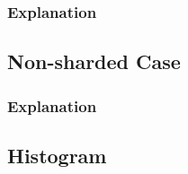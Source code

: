 \documentclass[11pt,a4paper]{article}
\begin{document}
\subsubsection{Explanation} \label{sec:gmg-true-exp}

\subsection{Non-sharded Case} \label{sec:gmg-false}

\subsubsection{Explanation} \label{sec:gmg-false-exp}

\subsection{Histogram} \label{sec:gmg-hist}
\end{document}
